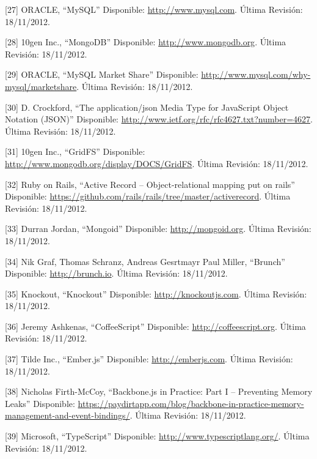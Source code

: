 \documentclass[12pt,spanish,letter]{report}
\begin{document}
{[}27{]} ORACLE, ``MySQL'' Disponible:
\href{http://www.mysql.com}{http://www.mysql.com}. Última Revisión:
18/11/2012.

{[}28{]} 10gen Inc., ``MongoDB'' Disponible:
\href{http://www.mongodb.org}{http://www.mongodb.org}. Última Revisión:
18/11/2012.

{[}29{]} ORACLE, ``MySQL Market Share'' Disponible:
\href{http://www.mysql.com/why-mysql/marketshare}{http://www.mysql.com/why-mysql/marketshare}.
Última Revisión: 18/11/2012.

{[}30{]} D. Crockford, ``The application/json Media Type for JavaScript
Object Notation (JSON)'' Disponible:
\href{http://www.ietf.org/rfc/rfc4627.txt?number=4627}{http://www.ietf.org/rfc/rfc4627.txt?number=4627}.
Última Revisión: 18/11/2012.

{[}31{]} 10gen Inc., ``GridFS'' Disponible:
\href{http://www.mongodb.org/display/DOCS/GridFS}{http://www.mongodb.org/display/DOCS/GridFS}.
Última Revisión: 18/11/2012.

{[}32{]} Ruby on Rails, ``Active Record -- Object-relational mapping put
on rails'' Disponible:
\href{https://github.com/rails/rails/tree/master/activerecord}{https://github.com/rails/rails/tree/master/activerecord}.
Última Revisión: 18/11/2012.

{[}33{]} Durran Jordan, ``Mongoid'' Disponible:
\href{http://mongoid.org}{http://mongoid.org}. Última Revisión:
18/11/2012.

{[}34{]} Nik Graf, Thomas Schranz, Andreas Gesrtmayr Paul Miller,
``Brunch'' Disponible: \href{http://brunch.io}{http://brunch.io}. Última
Revisión: 18/11/2012.

{[}35{]} Knockout, ``Knockout'' Disponible:
\href{http://knockoutjs.com}{http://knockoutjs.com}. Última Revisión:
18/11/2012.

{[}36{]} Jeremy Ashkenas, ``CoffeeScript'' Disponible:
\href{http://coffeescript.org}{http://coffeescript.org}. Última
Revisión: 18/11/2012.

{[}37{]} Tilde Inc., ``Ember.js'' Disponible:
\href{http://emberjs.com}{http://emberjs.com}. Última Revisión:
18/11/2012.

{[}38{]} Nicholas Firth-McCoy, ``Backbone.js in Practice: Part I --
Preventing Memory Leaks'' Disponible:
\href{https://paydirtapp.com/blog/backbone-in-practice-memory-management-and-event-bindings/}{https://paydirtapp.com/blog/backbone-in-practice-memory-management-and-event-bindings/}.
Última Revisión: 18/11/2012.

{[}39{]} Microsoft, ``TypeScript'' Disponible:
\href{http://www.typescriptlang.org/}{http://www.typescriptlang.org/}.
Última Revisión: 18/11/2012.
\end{document}
